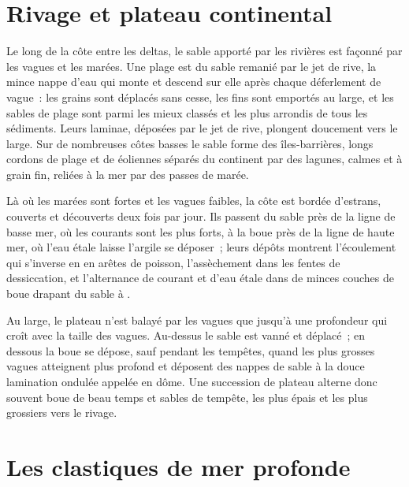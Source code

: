 \section{Rivage et plateau continental}\label{sec:b1:clastic-sediments:shoreline}

Le long de la côte entre les deltas, le sable apporté par les rivières est façonné par
les vagues et les marées. Une plage est du sable remanié par le jet de rive, la mince nappe d'eau
qui monte et descend sur elle après chaque déferlement de vague~: les grains sont déplacés sans cesse,
les fins sont emportés au large, et les sables de plage sont parmi les mieux
classés et les plus arrondis de tous les sédiments. Leurs laminae, déposées par le
jet de rive, plongent doucement vers le large. Sur de nombreuses côtes basses le sable forme des îles-barrières,
longs cordons de plage et de  éoliennes séparés du continent par
des lagunes, calmes et à grain fin, reliées à la mer par des passes
de marée.

Là où les marées sont fortes et les vagues faibles, la côte est bordée d'estrans,
couverts et découverts deux fois par jour. Ils passent du sable près de la ligne de basse mer,
où les courants sont les plus forts, à la boue près de la ligne de haute mer, où
l'eau étale laisse l'argile se déposer~; leurs dépôts montrent l'écoulement qui s'inverse en
 en arêtes de poisson, l'assèchement dans les fentes de dessiccation, et l'alternance
de courant et d'eau étale dans de minces couches de boue drapant du sable à .

Au large, le plateau n'est balayé par les vagues que jusqu'à une profondeur qui croît avec la
taille des vagues. Au-dessus le sable est vanné et déplacé~; en dessous la boue se dépose,
sauf pendant les tempêtes, quand les plus grosses vagues atteignent plus profond et déposent des nappes de
sable à la douce lamination ondulée appelée  en dôme.
Une succession de plateau alterne donc souvent boue de beau temps et sables de tempête, les
plus épais et les plus grossiers vers le rivage.

\section{Les clastiques de mer profonde}\label{sec:b1:clastic-sediments:deep-sea}


